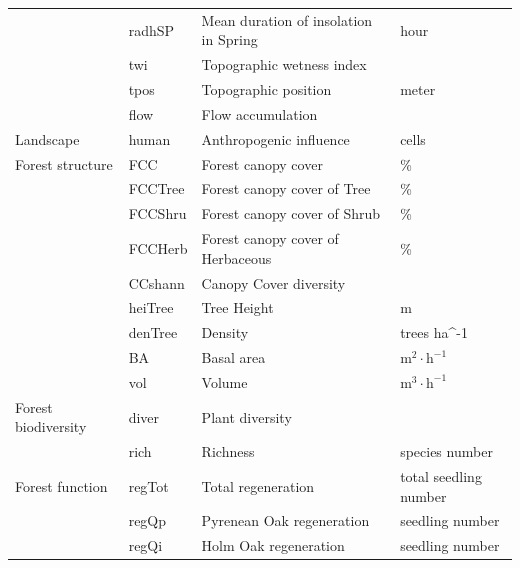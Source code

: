 \begin{table}[H]
\begin{tabular}{llll}
 & radhSP & Mean duration of insolation in Spring & hour \\
 & twi & Topographic wetness index &  \\
 & tpos & Topographic position & meter \\
 & flow & Flow accumulation &  \\ 
\hline
Landscape & human & Anthropogenic influence & cells \\ 
\hline
\multirow{}{}{Forest structure} & FCC & Forest canopy cover & \% \\
 & FCCTree & Forest canopy cover of Tree & \% \\
 & FCCShru & Forest canopy cover of Shrub & \% \\
 & FCCHerb & Forest canopy cover of Herbaceous & \% \\
 & CCshann & Canopy Cover diversity &  \\
 & heiTree & Tree Height & m \\
 & denTree & Density & trees ha^{-1} \\
 & BA & Basal area & \(\mathrm{m^2 \cdot h^{-1}}\) \\
 & vol & Volume & \(\mathrm{m^3 \cdot h^{-1}}\)\\ 
\hline
\multirow{}{}{Forest biodiversity} & diver & Plant diversity &  \\
 & rich & Richness & species number \\ 
\hline
\multirow{}{}{Forest function} & regTot & Total regeneration & total seedling number \\
 & regQp & Pyrenean Oak regeneration & seedling number \\
 & regQi & Holm Oak regeneration & seedling number \\
\hline
\end{tabular}
\endgroup{}
\end{table}

